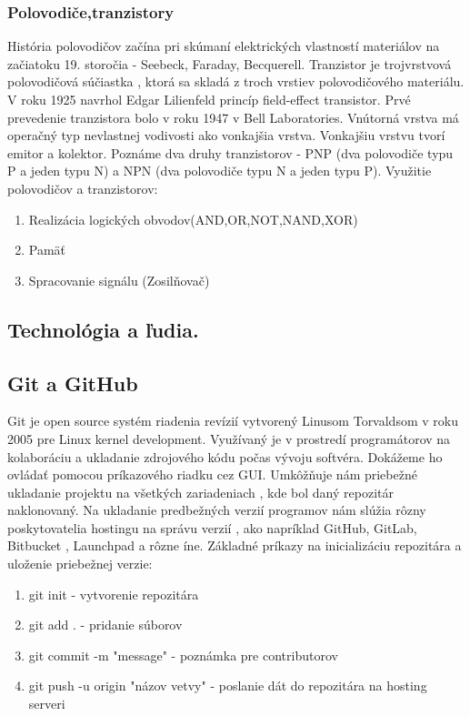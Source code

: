 \documentclass[10pt,oneside,slovak,a4paper]{article}
\begin{document}
\subsubsection{Polovodiče,tranzistory}
História polovodičov začína pri skúmaní elektrických vlastností materiálov na začiatoku 19. storočia - Seebeck, Faraday, Becquerell. \newline Tranzistor je trojvrstvová polovodičová súčiastka , ktorá sa skladá z troch vrstiev polovodičového materiálu. V roku 1925 navrhol Edgar Lilienfeld princíp field-effect transistor. Prvé prevedenie tranzistora bolo v roku 1947 v Bell Laboratories. Vnútorná vrstva má operačný typ nevlastnej vodivosti ako vonkajšia vrstva. Vonkajšiu vrstvu tvorí emitor a kolektor. Poznáme dva druhy tranzistorov - PNP  (dva polovodiče typu P a jeden typu N) a NPN (dva polovodiče typu N a jeden typu P). Využitie polovodičov a tranzistorov:
\begin{enumerate}
    \item{Realizácia logických obvodov(AND,OR,NOT,NAND,XOR)}
    \item{Pamäť}
    \item{Spracovanie signálu (Zosilňovač)}
\end{enumerate}
\subsection{Technológia a ľudia.}

\subsection{Git a GitHub}
Git je open source systém riadenia revízií vytvorený Linusom Torvaldsom v roku 2005 pre Linux kernel development. Využívaný je v prostredí programátorov na kolaboráciu a ukladanie zdrojového kódu počas vývoju softvéra. Dokážeme ho ovládať pomocou príkazového riadku cez GUI. Umkôžňuje nám priebežné ukladanie projektu na všetkých zariadeniach , kde bol daný repozitár naklonovaný. Na ukladanie predbežných verzií programov nám slúžia rôzny poskytovatelia hostingu na správu verzií , ako napríklad GitHub, GitLab, Bitbucket , Launchpad a rôzne íne. Základné príkazy na inicializáciu repozitára a uloženie priebežnej verzie: 
\begin{enumerate}
    \item{git init - vytvorenie repozitára}
    \item{git add . - pridanie súborov}
    \item{git commit -m "message" - poznámka pre contributorov}
    \item{git push -u origin "názov vetvy" - poslanie dát do repozitára na hosting serveri}
\end{enumerate}
\end{document}
